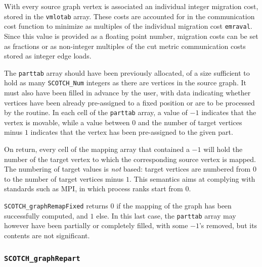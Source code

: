 \begin{itemize}
With every source graph vertex is associated an individual integer
migration cost, stored in the {\tt vmlotab} array. These costs are
accounted for in the communication cost function to minimize as
multiples of the individual migration cost {\tt emraval}. Since this
value is provided as a floating point number, migration costs can be
set as fractions or as non-integer multiples of the cut metric
communication costs stored as integer edge loads.

The {\tt parttab} array should have been previously allocated, of a
size sufficient to hold as many {\tt SCOTCH\_\lbt Num} integers as
there are vertices in the source graph. It must also have been filled
in advance by the user, with data indicating whether vertices have
been already pre-assigned to a fixed position or are to be processed
by the routine. In each cell of the {\tt parttab} array, a value of
$-1$ indicates that the vertex is movable, while a value between $0$
and the number of target vertices minus $1$ indicates that the vertex
has been pre-assigned to the given part.

On return, every cell of the mapping array that contained a $-1$ will
hold the number of the target vertex to which the corresponding source
vertex is mapped. The numbering of target values is {\em not\/}
based: target vertices are numbered from $0$ to the number of target
vertices minus $1$. This semantics aims at complying with standards
such as MPI, in which process ranks start from $0$.

\progret

{\tt SCOTCH\_graphRemapFixed} returns $0$ if the mapping of the
graph has been successfully computed, and $1$ else. In this last case,
the {\tt parttab} array may however have been partially or completely
filled, with some $-1$'s removed, but its contents are not significant.
\end{itemize}

\subsubsection{{\tt SCOTCH\_graphRepart}}

